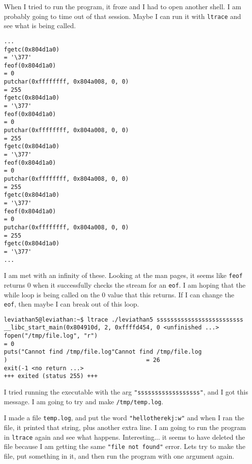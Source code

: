 \documentclass[11pt]{article}
\begin{document}
When I tried to run the program, it froze and I had to open another shell. I am probably going to time out of that session. Maybe I can run it with \verb|ltrace| and see what is being called.

\begin{lstlisting}
...
fgetc(0x804d1a0)                                                         = '\377'
feof(0x804d1a0)                                                          = 0
putchar(0xffffffff, 0x804a008, 0, 0)                                     = 255
fgetc(0x804d1a0)                                                         = '\377'
feof(0x804d1a0)                                                          = 0
putchar(0xffffffff, 0x804a008, 0, 0)                                     = 255
fgetc(0x804d1a0)                                                         = '\377'
feof(0x804d1a0)                                                          = 0
putchar(0xffffffff, 0x804a008, 0, 0)                                     = 255
fgetc(0x804d1a0)                                                         = '\377'
feof(0x804d1a0)                                                          = 0
putchar(0xffffffff, 0x804a008, 0, 0)                                     = 255
fgetc(0x804d1a0)                                                         = '\377'
...
\end{lstlisting}

I am met with an infinity of these. Looking at the man pages, it seems like \verb|feof| returns 0 when it successfully checks the stream for an \verb|eof|. I am hoping that the while loop is being called on the 0 value that this returns. If I can change the \verb|eof|, then maybe I can break out of this loop.

\begin{lstlisting}
leviathan5@leviathan:~$ ltrace ./leviathan5 sssssssssssssssssssssssss
__libc_start_main(0x804910d, 2, 0xffffd454, 0 <unfinished ...>
fopen("/tmp/file.log", "r")                                              = 0
puts("Cannot find /tmp/file.log"Cannot find /tmp/file.log
)                                        = 26
exit(-1 <no return ...>
+++ exited (status 255) +++
\end{lstlisting}

I tried running the executable with the arg \verb|"ssssssssssssssssss"|, and I got this message. I am going to try and make \verb|/tmp/temp.log|.

I made a file \verb|temp.log|, and put the word \verb|"hellotherekj:w"| and when I ran the file, it printed that string, plus another extra line. I am going to run the program in \verb|ltrace| again and see what happens.
Interesting... it seems to have deleted the file because I am getting the same \verb|"file not found"| error. Lets try to make the file, put something in it, and then run the program with one argument again.
\end{document}

